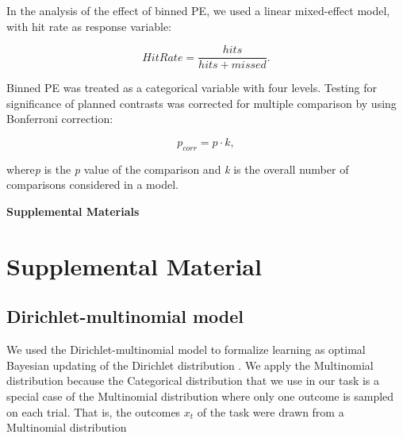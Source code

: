 \documentclass[a4paper,12pt]{article}
\begin{document}
\noindent
In the analysis of the effect of binned PE, we used a linear mixed-effect model, with hit rate as response variable:

\begin{equation}
Hit Rate =   \dfrac{hits}{hits+missed}.
\end{equation}

\noindent
Binned PE was treated as a categorical variable with four levels. Testing for significance of planned contrasts was corrected for multiple comparison by using Bonferroni correction:

\begin{equation}
p_{corr} =   p \cdot k, 
\end{equation}

\noindent
where\textit{p} is the \textit{p} value of the comparison and \textit{k} is the overall number of comparisons considered in a model. 





%
 

\pagebreak
\begin{center}
\textbf{\large Supplemental Materials}
\end{center}
\setcounter{equation}{0}
\setcounter{figure}{0}
\setcounter{table}{0}
\setcounter{page}{1}
\makeatletter
\renewcommand{\theequation}{S\arabic{equation}}
\renewcommand{\thefigure}{S\arabic{figure}}
\renewcommand{\bibnumfmt}[1]{[S#1]}
\renewcommand{\citenumfont}[1]{S#1}



\section{Supplemental Material}
\subsection*{Dirichlet-multinomial model}

We used the Dirichlet-multinomial model to formalize learning as optimal Bayesian updating of the Dirichlet distribution \citep{Murphy2012}. We apply the Multinomial distribution because the Categorical distribution that we use in our task is a special case of the Multinomial distribution where only one outcome is sampled on each trial. That is, the outcomes $x_t$ of the task were drawn from a Multinomial distribution
\end{document}
